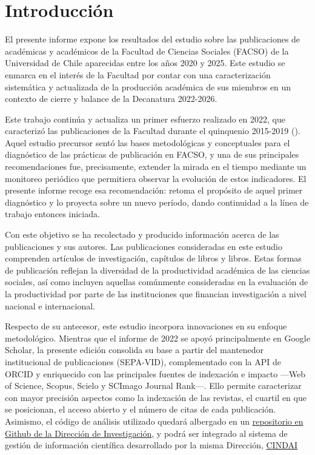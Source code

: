 \documentclass[
  spanish,
  a4paper,
  oneside]{scrbook}
\begin{document}
\chapter{Introducción}\label{sec-introduction}

\renewcommand{\thechapter}{\arabic{chapter}}

El presente informe expone los resultados del estudio sobre las
publicaciones de académicas y académicos de la Facultad de Ciencias
Sociales (FACSO) de la Universidad de Chile aparecidas entre los años
2020 y 2025. Este estudio se enmarca en el interés de la Facultad por
contar con una caracterización sistemática y actualizada de la
producción académica de sus miembros en un contexto de cierre y balance
de la Decanatura 2022-2026.

Este trabajo continúa y actualiza un primer esfuerzo realizado en 2022,
que caracterizó las publicaciones de la Facultad durante el quinquenio
2015-2019 (). Aquel
estudio precursor sentó las bases metodológicas y conceptuales para el
diagnóstico de las prácticas de publicación en FACSO, y una de sus
principales recomendaciones fue, precisamente, extender la mirada en el
tiempo mediante un monitoreo periódico que permitiera observar la
evolución de estos indicadores. El presente informe recoge esa
recomendación: retoma el propósito de aquel primer diagnóstico y lo
proyecta sobre un nuevo período, dando continuidad a la línea de trabajo
entonces iniciada.

Con este objetivo se ha recolectado y producido información acerca de
las publicaciones y sus autores. Las publicaciones consideradas en este
estudio comprenden artículos de investigación, capítulos de libros y
libros. Estas formas de publicación reflejan la diversidad de la
productividad académica de las ciencias sociales, así como incluyen
aquellas comúnmente consideradas en la evaluación de la productividad
por parte de las instituciones que financian investigación a nivel
nacional e internacional.

Respecto de su antecesor, este estudio incorpora innovaciones en su
enfoque metodológico. Mientras que el informe de 2022 se apoyó
principalmente en Google Scholar, la presente edición consolida su base
a partir del mantenedor institucional de publicaciones (SEPA-VID),
complementado con la API de ORCID y enriquecido con las principales
fuentes de indexación e impacto ---Web of Science, Scopus, Scielo y
SCImago Journal Rank---. Ello permite caracterizar con mayor precisión
aspectos como la indexación de las revistas, el cuartil en que se
posicionan, el acceso abierto y el número de citas de cada publicación.
Asimismo, el código de análisis utilizado quedará albergado en un
\href{https://github.com/facso-investigacion/publicaciones-facso}{repositorio
en Github de la Dirección de Investigación}, y podrá ser integrado al
sistema de gestión de información científica desarrollado por la misma
Dirección,
\href{https://facso-investigacion.github.io/documentacion-cindai/}{CINDAI}
\end{document}
